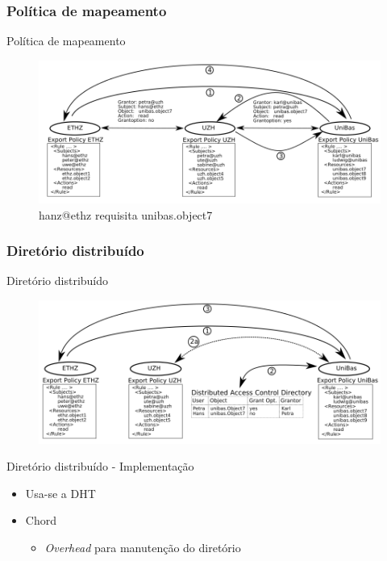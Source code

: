 \documentclass{beamer}
\begin{document}
\subsubsection{Política de mapeamento}
  \begin{frame}{Política de mapeamento}
   \begin{figure}[H]
    \includegraphics[scale=0.36]{demap_fig2_mp.png}
    \caption{hanz@ethz requisita unibas.object7}
   \end{figure}

  \end{frame}


\subsubsection{Diretório distribuído}
  \begin{frame}{Diretório distribuído}
   \begin{figure}[H]
    \includegraphics[scale=0.36]{demap_fig3_dd.png}
   \end{figure}

  \end{frame}
  
  \begin{frame}{Diretório distribuído - Implementação}
    \begin{itemize}
     \item Usa-se a DHT
     \item Chord
     \begin{itemize}
      \item \textit{Overhead} para manutenção do diretório
     \end{itemize}

    \end{itemize}

  \end{frame}
  
\end{document}
